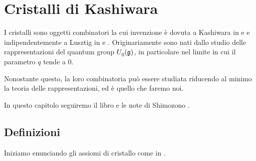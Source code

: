 
\chapter{Cristalli di Kashiwara}
\label{ch:crystals}


I cristalli sono oggetti combinatori la cui invenzione \`e dovuta
a Kashiwara in \cite{kashiwara1990}
e \cite{kashiwara1991} e indipendentemente a Lusztig in
\cite{lusztig1990a} e \cite{lusztig1990b}.
Originariamente sono nati dallo studio delle rappresentazioni del 
quantum group $U_q(\mathfrak{g})$, in particolare nel limite in cui il parametro $q$
tende a $0$.

Nonostante questo, la loro combinatoria pu\`o essere studiata
riducendo al minimo la teoria delle rappresentazioni, ed \`e quello che 
faremo noi.

In questo capitolo seguiremo il libro \cite{bump-schilling-17}
e le note di Shimozono \cite{shimozono2005crystals}.

\section{Definizioni}

Iniziamo enunciando gli assiomi di cristallo come in
\cite[Definition~2.13]{bump-schilling-17}.

